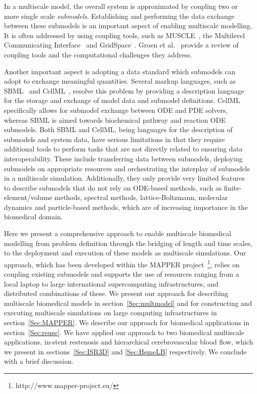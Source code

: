 \documentclass[a4,10pt]{article}
\begin{document}
In a multiscale model, the overall system is approximated by coupling two or
more single scale {\em submodels}. Establishing and performing the data
exchange between these submodels is an important aspect of enabling multiscale
modelling.  It is often addressed by using coupling tools, such as
MUSCLE~\cite{Hegewald:2008,Borgdorff:2012}, the Multilevel Communicating
Interface~\cite{Grinberg:2011} and GridSpace~\cite{Ciepiela:2010}. Groen et
al.~\cite{Groen:2012-3} provide a review of coupling tools and the
computational challenges they address.

Another important aspect  is adopting a data standard which submodels can adopt
to exchange meaningful quantities. Several markup languages, such as
SBML~\cite{Hucka:2003} and CellML~\cite{Lloyd:2004}, resolve this problem by
providing a description language for the storage and exchange of model data and
submodel definitions.  CellML specifically allows for submodel exchange between
ODE and PDE solvers, whereas SBML is aimed towards biochemical pathway and
reaction ODE submodels. Both SBML and CellML, being languages for the
description of submodels and system data, have serious limitations in that they
require additional tools to perform tasks that are not directly related to
ensuring data interoperability. These include transferring data between submodels,
deploying submodels on appropriate resources and orchestrating the interplay of
submodels in a multiscale simulation. Additionally, they only provide very
limited features to describe submodels that do not rely on ODE-based methods,
such as finite-element/volume methods, spectral methods, lattice-Boltzmann,
molecular dynamics and particle-based methods, which are of increasing 
importance in the biomedical domain.

Here we present a comprehensive approach to enable multiscale biomedical
modelling from problem definition through the bridging of length and time scales,
to the deployment and execution of these models as multiscale
simulations. Our approach, which has been developed within the MAPPER
project~\footnote{http://www.mapper-project.eu/}, relies on coupling existing submodels and supports
the use of resources ranging from a local laptop to large international
supercomputing infrastructures, and distributed combinations of these.  We
present our approach for describing multiscale biomedical models in
section~\ref{Sec:multmodel} and for constructing and executing multiscale
simulations on large computing infrastructures in section~\ref{Sec:MAPPER}. We
describe our approach for biomedical applications in
section~\ref{Sec:reuse}. We have applied our approach to two biomedical
multiscale applications, in-stent restenosis and hierarchical cerebrovascular
blood flow, which we present in sections~\ref{Sec:ISR3D} and \ref{Sec:HemeLB}
respectively. We conclude with a brief discussion.
\end{document}
